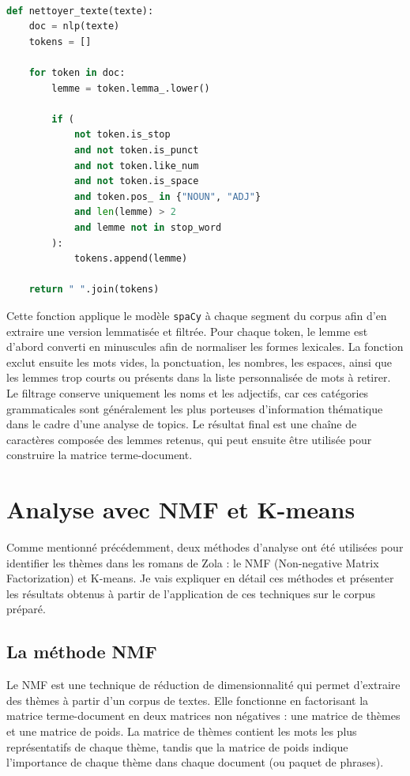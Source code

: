 \documentclass{article}
\begin{document}
\begin{lstlisting}[language=Python, caption={Fonction de lemmatisation avec exclusion de mots spécifiques}]

def nettoyer_texte(texte):
    doc = nlp(texte)
    tokens = []

    for token in doc:
        lemme = token.lemma_.lower()

        if (
            not token.is_stop
            and not token.is_punct
            and not token.like_num
            and not token.is_space
            and token.pos_ in {"NOUN", "ADJ"}
            and len(lemme) > 2
            and lemme not in stop_word
        ):
            tokens.append(lemme)

    return " ".join(tokens)
\end{lstlisting}

Cette fonction applique le modèle \texttt{spaCy} à chaque segment du corpus afin d'en extraire une version lemmatisée et filtrée. Pour chaque token, le lemme est d'abord converti en minuscules afin de normaliser les formes lexicales. La fonction exclut ensuite les mots vides, la ponctuation, les nombres, les espaces, ainsi que les lemmes trop courts ou présents dans la liste personnalisée de mots à retirer. Le filtrage conserve uniquement les noms et les adjectifs, car ces catégories grammaticales sont généralement les plus porteuses d'information thématique dans le cadre d'une analyse de topics. Le résultat final est une chaîne de caractères composée des lemmes retenus, qui peut ensuite être utilisée pour construire la matrice terme-document.

\newpage
\section{Analyse avec NMF et K-means}

Comme mentionné précédemment, deux méthodes d'analyse ont été utilisées pour identifier les thèmes dans les romans de Zola : le NMF (Non-negative Matrix Factorization) et K-means. Je vais expliquer en détail ces méthodes et présenter les résultats obtenus à partir de l'application de ces techniques sur le corpus préparé.

\subsection{La méthode NMF}

Le NMF est une technique de réduction de dimensionnalité qui permet d'extraire des thèmes à partir d'un corpus de textes. Elle fonctionne en factorisant la matrice terme-document en deux matrices non négatives : une matrice de thèmes et une matrice de poids. La matrice de thèmes contient les mots les plus représentatifs de chaque thème, tandis que la matrice de poids indique l'importance de chaque thème dans chaque document (ou paquet de phrases).
\end{document}

